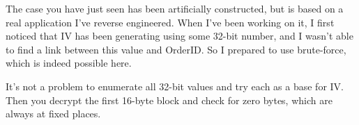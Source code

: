 The case you have just seen has been artificially constructed, but is based on a real application I've reverse engineered.
When I've been working on it, I first noticed that \ac{IV} has been generating using some 32-bit number,
and I wasn't able to find a link between this value and OrderID.
So I prepared to use brute-force, which is indeed possible here.

It's not a problem to enumerate all 32-bit values and try each as a base for \ac{IV}.
Then you decrypt the first 16-byte block and check for zero bytes, which are always at fixed places.
